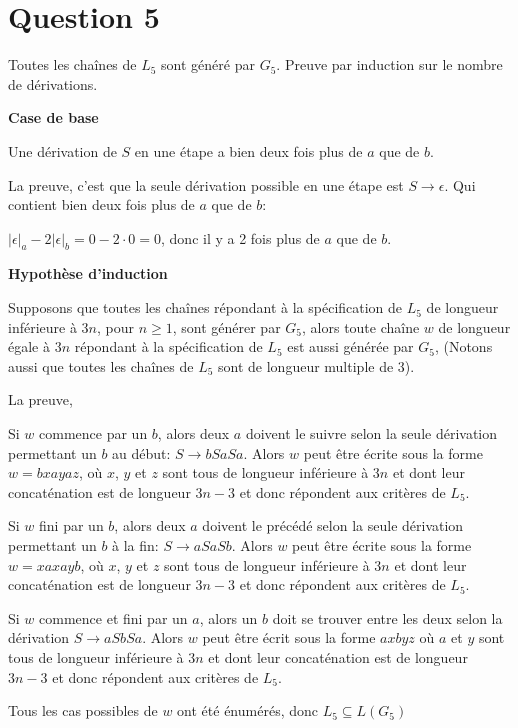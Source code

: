 \documentclass[class=article]{standalone}
\begin{document}
\section*{Question 5}

Toutes les chaînes de $L_5$ sont généré par $G_5$. Preuve par induction sur le nombre de dérivations.

{\bf Case de base}

Une dérivation de $S$ en une étape a bien deux fois plus de $a$ que de $b$. 

La preuve, c'est que la seule dérivation possible en une 
étape est $S \rightarrow \epsilon$. Qui contient bien deux fois 
plus de $a$ que de $b$: 

$|\epsilon|_a - 2|\epsilon|_b = 0 - 2\cdot0 = 0$,
donc il y a 2 fois plus de $a$ que de $b$.

{\bf Hypothèse d'induction}

Supposons que toutes les chaînes répondant à la spécification de $L_5$
de longueur inférieure à $3n$, pour $n \geq 1$, sont générer par $G_5$,
alors toute chaîne $w$ de longueur égale à $3n$ répondant à la spécification de $L_5$
est aussi générée par $G_5$, 
(Notons aussi que toutes les chaînes de $L_5$ 
sont de longueur multiple de 3). 

La preuve, 

Si $w$ commence par un $b$, alors deux $a$ doivent 
le suivre selon la seule dérivation permettant un $b$ au début: $S \rightarrow bSaSa$.
Alors $w$ peut être écrite sous la forme 
$w = bxayaz$, où $x$, $y$ et $z$ 
sont tous de longueur inférieure à $3n$ et dont leur concaténation
est de longueur $3n-3$ 
et donc répondent aux critères de $L_5$.


Si $w$ fini par un $b$, alors deux $a$ doivent 
le précédé selon la seule dérivation permettant un $b$ à la fin: $S \rightarrow aSaSb$.
Alors $w$ peut être écrite sous la forme 
$w = xaxayb$, où $x$, $y$ et $z$
sont tous de longueur inférieure à $3n$ et dont leur concaténation
est de longueur $3n-3$ et donc répondent aux critères de $L_5$.

Si $w$ commence et fini par un $a$, alors un $b$ doit se trouver entre
les deux selon la dérivation $S \rightarrow aSbSa$.
Alors $w$ peut être écrit sous la forme
$axbyz$ où $a$ et $y$
sont tous de longueur inférieure à $3n$ et dont leur concaténation
est de longueur $3n-3$ et donc répondent aux critères de $L_5$.

Tous les cas possibles de $w$ ont été énumérés, donc $L_5 \subseteq L(G_5)$
\end{document}
